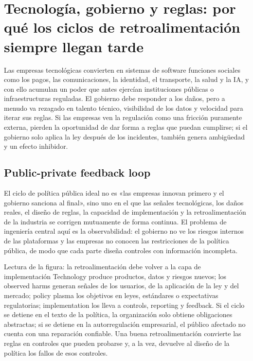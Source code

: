 \section{Tecnología, gobierno y reglas: por qué los ciclos de retroalimentación siempre llegan tarde}

Las empresas tecnológicas convierten en sistemas de software funciones sociales como los pagos, las comunicaciones, la identidad, el transporte, la salud y la IA, y con ello acumulan un poder que antes ejercían instituciones públicas o infraestructuras reguladas. El gobierno debe responder a los daños, pero a menudo va rezagado en talento técnico, visibilidad de los datos y velocidad para iterar sus reglas. Si las empresas ven la regulación como una fricción puramente externa, pierden la oportunidad de dar forma a reglas que puedan cumplirse; si el gobierno solo aplica la ley después de los incidentes, también genera ambigüedad y un efecto inhibidor.

\subsection{Public-private feedback loop}

El ciclo de política pública ideal no es «las empresas innovan primero y el gobierno sanciona al final», sino uno en el que las señales tecnológicas, los daños reales, el diseño de reglas, la capacidad de implementación y la retroalimentación de la industria se corrigen mutuamente de forma continua. El problema de ingeniería central aquí es la observabilidad: el gobierno no ve los riesgos internos de las plataformas y las empresas no conocen las restricciones de la política pública, de modo que cada parte diseña controles con información incompleta.


\begin{knowledgebox}{Lectura de la figura: la retroalimentación debe volver a la capa de implementación}
Technology produce productos, datos y riesgos nuevos; los observed harms generan señales de los usuarios, de la aplicación de la ley y del mercado; policy plasma los objetivos en leyes, estándares o expectativas regulatorias; implementation los lleva a controls, reporting y feedback. Si el ciclo se detiene en el texto de la política, la organización solo obtiene obligaciones abstractas; si se detiene en la autorregulación empresarial, el público afectado no cuenta con una reparación confiable. Una buena retroalimentación convierte las reglas en controles que pueden probarse y, a la vez, devuelve al diseño de la política los fallos de esos controles.
\end{knowledgebox}


